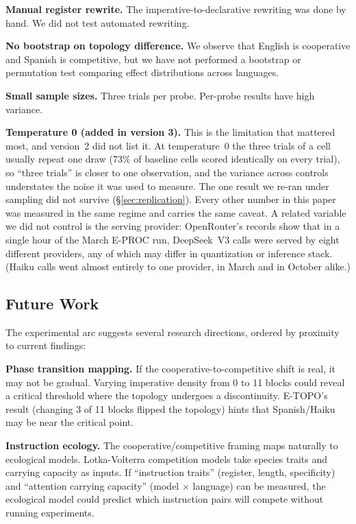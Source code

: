 \documentclass[11pt,a4paper]{article}
\begin{document}
\textbf{Manual register rewrite.} The imperative-to-declarative
rewriting was done by hand. We did not test automated rewriting.

\textbf{No bootstrap on topology difference.} We observe that English
is cooperative and Spanish is competitive, but we have not performed
a bootstrap or permutation test comparing effect distributions across
languages.

\textbf{Small sample sizes.} Three trials per probe. Per-probe
results have high variance.

\textbf{Temperature 0 (added in version 3).} This is the limitation
that mattered most, and version~2 did not list it. At temperature~0
the three trials of a cell usually repeat one draw (73\% of baseline
cells scored identically on every trial), so ``three trials'' is
closer to one observation, and the variance across controls
understates the noise it was used to measure. The one result we
re-ran under sampling did not survive (\S\ref{sec:replication}). Every
other number in this paper was measured in the same regime and
carries the same caveat. A related variable we did not control is the
serving provider: OpenRouter's records show that in a single hour of
the March E-PROC run, DeepSeek~V3 calls were served by eight different
providers, any of which may differ in quantization or inference stack.
(Haiku calls went almost entirely to one provider, in March and in
October alike.)

\subsection{Future Work}

The experimental arc suggests several research directions, ordered
by proximity to current findings:

\textbf{Phase transition mapping.} If the cooperative-to-competitive
shift is real, it may not be gradual. Varying imperative density from 0 to 11 blocks
could reveal a critical threshold where the topology undergoes a
discontinuity. E-TOPO's result (changing 3 of 11 blocks flipped the
topology) hints that Spanish/Haiku may be near the critical point.

\textbf{Instruction ecology.} The cooperative/competitive framing
maps naturally to ecological models. Lotka-Volterra competition
models take species traits and carrying capacity as inputs. If
``instruction traits'' (register, length, specificity) and ``attention
carrying capacity'' (model $\times$ language) can be measured, the
ecological model could predict which instruction pairs will compete
without running experiments.
\end{document}
